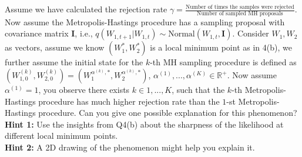 \begin{enumerate}
\begin{enumerate}
    Assume we have calculated the rejection rate $\gamma = \frac{\text{Number of times the samples were rejected}}{\text{Number of sampled MH proposals}}$. Now assume the Metropolis-Hastings procedure has a sampling proposal with covariance matrix $\mathbf{I}$, i.e., $q(W_{1,t+1}|W_{1,t}) \sim \text{Normal}(W_{1,t},\mathbf{I} )$. Consider $W_1, W_2$ as vectors, assume we know $(W_1^*, W_2^*)$ is a local minimum point as in 4(b), we further assume the initial state for the $k$-th MH sampling procedure is defined as $(W^{(k)}_{1,0}, W^{(k)}_{2,0}) = (W_1^{\alpha^{(k)},*}, W_2^{\alpha^{(k)},*})$, $\alpha^{(1)},...,\alpha^{(K)}\in \mathbb{R}^+$. Now assume $\alpha^{(1)}=1$, you observe there exists $k\in {1,...,K}$, such that the $k$-th Metropolis-Hastings procedure has much higher rejection rate than the $1$-st Metropolis-Hastings procedure. Can you give one possible explanation for this phenomenon?
    \\
    {\bf Hint 1:} Use the insights from Q4(b) about the sharpness of the likelihood at different local minimum points.\\
    {\bf Hint 2:} A 2D drawing of the phenomenon might help you explain it.\\
    
    
     
\end{enumerate}


\end{enumerate}

